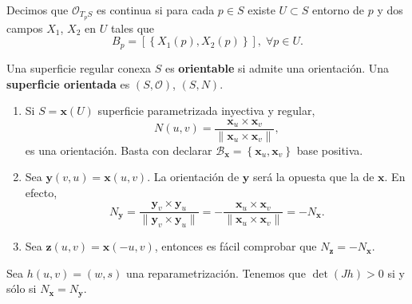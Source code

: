 \begin{notation}
Decimos que $\displaystyle \mathcal{O}_{T_{p}S} $ es continua si para cada $\displaystyle p \in S $ existe $\displaystyle U\subset S $ entorno de $\displaystyle p $ y dos campos $\displaystyle X_{1} $, $\displaystyle X_{2} $ en $\displaystyle U $ tales que 
	\[B_{p}=\left[ \left\{ X_{1}\left(p\right), X_{2}\left(p\right)\right\} \right] , \; \forall p \in U .\]
\end{notation}
\begin{definition}
Una superficie regular conexa $\displaystyle S $ es \textbf{orientable} si admite una orientación. Una \textbf{superficie orientada} es $\displaystyle \left(S, \mathcal{O}\right) $, $\displaystyle \left(S, N\right) $.
\end{definition}
\begin{eg}
\begin{enumerate}
\item Si $\displaystyle S = \textbf{x} \left(U\right) $ superficie parametrizada inyectiva y regular, 
	\[N\left(u,v\right)=\frac{ \textbf{x} _{u} \times \textbf{x} _{v}}{\| \textbf{x} _{u}\times \textbf{x} _{v}\|} ,\]
	es una orientación. Basta con declarar $\displaystyle \mathcal{B}_{ \textbf{x} }=\left\{ \textbf{x} _{u}, \textbf{x} _{v}\right\}  $ base positiva. 
\item Sea $\displaystyle \textbf{y} \left(v,u\right)= \textbf{x} \left(u,v\right) $. La orientación de $\displaystyle \textbf{y}  $ será la opuesta que la de $\displaystyle \textbf{x}  $. En efecto, 
	\[N_{ \textbf{y} }= \frac{ \textbf{y} _{v} \times \textbf{y} _{u}}{ \| \textbf{y} _{v} \times \textbf{y} _{u}\|}=-\frac{ \textbf{x} _{u} \times \textbf{x} _{v}}{\| \textbf{x} _{u} \times \textbf{x} _{v}\|}=-N_{ \textbf{x} } .\]
	\item Sea $\displaystyle \textbf{z} \left(u,v\right)= \textbf{x}\left(-u, v\right)  $, entonces es fácil comprobar que $\displaystyle N _{ \textbf{z} }=- N_{ \textbf{x} } $. 
\end{enumerate}
\end{eg}
\begin{prop}
Sea $\displaystyle h\left(u,v\right)=\left(w,s\right) $ una reparametrización. Tenemos que $\displaystyle \det\left(Jh\right)>0 $ si y sólo si $\displaystyle N_{ \textbf{x} }= N_{ \textbf{y} } $.  
\end{prop}
